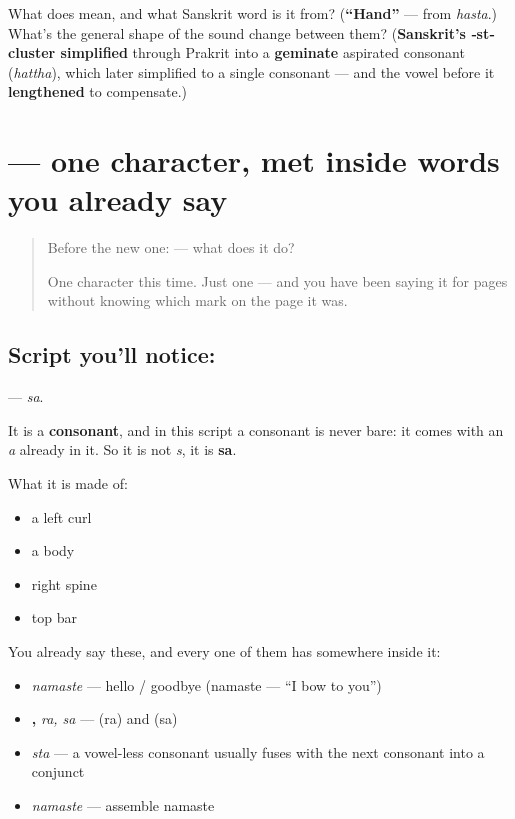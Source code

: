 \begin{tcolorbox}[breakable,colback=teal!4,colframe=teal!35!black,title={Before you move on}]
What does \textbf{} mean, and what Sanskrit word is it from? (\textbf{\textquotedblleft{}Hand\textquotedblright{}} — from \textbf{} \emph{hasta}.) What's the general shape of the sound change between them? (\textbf{Sanskrit's ‑st‑ cluster simplified} through Prakrit into a \textbf{geminate} aspirated consonant (\emph{hattha}), which later simplified to a single consonant — and the vowel before it \textbf{lengthened} to compensate.)
\end{tcolorbox}
\section[\texorpdfstring{\hi{स} (sa)}{स (sa)}]{ — one character, met inside words you already say}

\label{lesson:HI-S08-letter-sa}



\begin{quote}
Before the new one:  — what does it do?

One character this time. Just one — and you have been saying it for pages without knowing which mark on the page it was.
\end{quote}

\subsection*{Script you'll notice: }
\textbf{} — \emph{sa}.

It is a \textbf{consonant}, and in this script a consonant is never bare: it comes with an \emph{a} already in it. So it is not \emph{s}, it is \textbf{sa}.

What it is made of:

\begin{itemize}
\raggedright
  \item a left curl
  \item a body
  \item right spine
  \item top bar
\end{itemize}

You already say these, and every one of them has  somewhere inside it:

\begin{itemize}
\raggedright
  \item \textbf{} \emph{namaste} — hello / goodbye (namaste — \textquotedblleft{}I bow to you\textquotedblright{})
  \item \textbf{, } \emph{ra, sa} —  (ra) and  (sa)
  \item \textbf{} \emph{sta} — a vowel-less consonant usually fuses with the next consonant into a conjunct
  \item \textbf{} \emph{namaste} — assemble namaste
\end{itemize}

